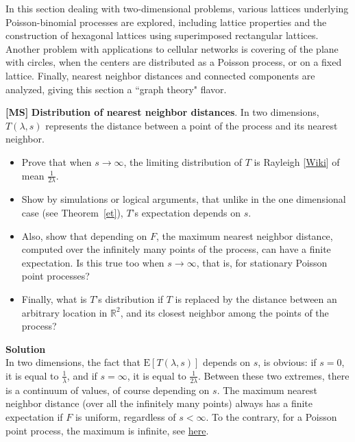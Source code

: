 \documentclass[10pt]{article}
\begin{document}
In this section dealing with two-dimensional problems, various lattices underlying Poisson-binomial processes are explored, including lattice properties and the construction of hexagonal lattices using superimposed rectangular lattices. Another problem with applications to cellular networks is covering of the 
plane with circles, when the centers are distributed as a Poisson process, or on a fixed lattice.  Finally, nearest neighbor distances and 
connected components are analyzed, giving this section a ``graph theory" flavor.

\begin{Exercise}\label{exercise14b}{\bf [MS]} 
{\bf Distribution of nearest neighbor distances}.  In two dimensions, $T(\lambda,s)$ represents the distance between a point of the process and its \textcolor{index}{nearest neighbor}. 
\begin{itemize}
\item Prove that when $s\rightarrow\infty$, the limiting distribution of $T$ is \textcolor{index}{Rayleigh} [\href{https://en.wikipedia.org/wiki/Rayleigh_distribution}{Wiki}] of mean $\frac{1}{2\lambda}$. 
\item Show by simulations or logical arguments, that unlike in the one dimensional case (see Theorem~\ref{et}), $T$'s expectation depends on $s$. 
\item Also, show that depending on $F$, the maximum \textcolor{index}{nearest neighbor distance}, computed over the infinitely many points of the process, can have a finite expectation. Is this true too when $s\rightarrow\infty$, that is, for stationary Poisson point processes? 
\item Finally, what is $T$'s distribution if $T$ is replaced by the distance between an arbitrary location in $\mathbb{R}^2$, and its closest neighbor among the points 
of the process? 
\end{itemize}
{\bf Solution} \nopagebreak \vspace{1ex}   \\ 
In two dimensions, the fact that $\mbox{E}[T(\lambda,s)]$ depends on $s$, is obvious: if $s=0$, it is equal to $\frac{1}{\lambda}$, and if $s=\infty$, it is equal to $\frac{1}{2\lambda}$. Between these two extremes, there is a continuum of values, of course depending on $s$. The maximum nearest neighbor distance (over all the infinitely many points) always has a finite expectation if $F$ is uniform, regardless of $s<\infty$. To the contrary, for a Poisson point process, the maximum is infinite, see \href{https://mathoverflow.net/questions/412891/maximum-nearest-neighbor-distance-for-a-poisson-point-process/412895#412895}{here}. \vspace{1ex} \\

\end{Exercise}
\end{document}
